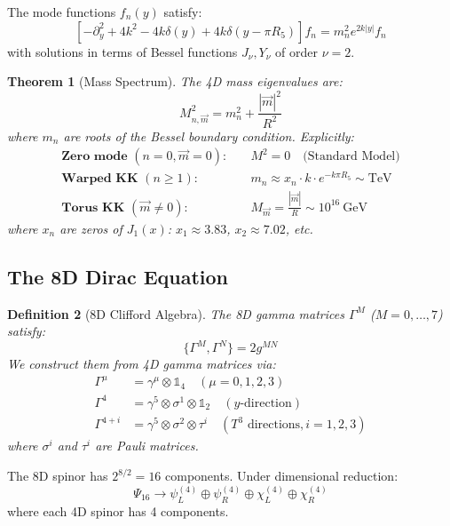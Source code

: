 \documentclass[12pt,a4paper]{article}
\newtheorem{theorem}{Theorem}[section]
\newtheorem{definition}[theorem]{Definition}
\begin{document}
The mode functions $f_n(y)$ satisfy:
\begin{equation}
\left[-\partial_y^2 + 4k^2 - 4k\delta(y) + 4k\delta(y-\pi R_5)\right]f_n = m_n^2 e^{2k|y|}f_n
\end{equation}
with solutions in terms of Bessel functions $J_\nu, Y_\nu$ of order $\nu = 2$.

\begin{theorem}[Mass Spectrum]
The 4D mass eigenvalues are:
\begin{equation}
M^2_{n,\vec{m}} = m_n^2 + \frac{|\vec{m}|^2}{R^2}
\end{equation}
where $m_n$ are roots of the Bessel boundary condition. Explicitly:
\begin{align}
\textbf{Zero mode } (n=0, \vec{m}=0): \quad & M^2 = 0 \quad \text{(Standard Model)} \\
\textbf{Warped KK } (n \geq 1): \quad & m_n \approx x_n \cdot k \cdot e^{-k\pi R_5} \sim \text{TeV} \\
\textbf{Torus KK } (\vec{m} \neq 0): \quad & M_{\vec{m}} = \frac{|\vec{m}|}{R} \sim 10^{16}~\text{GeV}
\end{align}
where $x_n$ are zeros of $J_1(x)$: $x_1 \approx 3.83$, $x_2 \approx 7.02$, etc.
\end{theorem}

\subsection{The 8D Dirac Equation}

\begin{definition}[8D Clifford Algebra]
The 8D gamma matrices $\Gamma^M$ ($M = 0,\ldots,7$) satisfy:
\begin{equation}
\{\Gamma^M, \Gamma^N\} = 2g^{MN}
\end{equation}
We construct them from 4D gamma matrices via:
\begin{align}
\Gamma^\mu &= \gamma^\mu \otimes \mathbb{1}_4 \quad (\mu = 0,1,2,3) \\
\Gamma^4 &= \gamma^5 \otimes \sigma^1 \otimes \mathbb{1}_2 \quad (y\text{-direction}) \\
\Gamma^{4+i} &= \gamma^5 \otimes \sigma^2 \otimes \tau^i \quad (T^3 \text{ directions}, i=1,2,3)
\end{align}
where $\sigma^i$ and $\tau^i$ are Pauli matrices.
\end{definition}

The 8D spinor has $2^{8/2} = 16$ components. Under dimensional reduction:
\begin{equation}
\Psi_{16} \to \psi_L^{(4)} \oplus \psi_R^{(4)} \oplus \chi_L^{(4)} \oplus \chi_R^{(4)}
\end{equation}
where each 4D spinor has 4 components.
\end{document}

